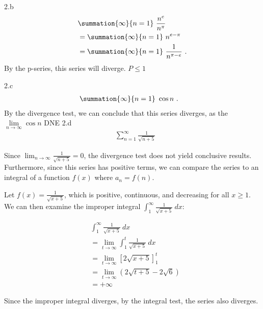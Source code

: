 \documentclass{report}
\begin{document}
    \pagebreak \bigbreak \noindent 
    2.b
    \begin{align*}
        &\summation{\infty}{n=1}\ \frac{n^{e}}{n^{\pi}}\  \\
        &=\summation{\infty}{n=1}\ n^{e-\pi}\  \\
        &=\summation{\infty}{n=1}\ \frac{1}{n^{\pi-e}}\ 
    .\end{align*}
    By the p-series, this series will diverge. $P \leq 1$

    \bigbreak \noindent 
    2.c
    \begin{align*}
        &\summation{\infty}{n=1}\ \cos{n}\ 
    .\end{align*}
    By the divergence test, we can conclude that this series diverges, as the $\lim\limits_{n \to \infty}{\cos{n}} $ DNE
    \bigbreak \noindent 
    2.d
    \begin{align*}
    &\sum_{n=1}^{\infty} \frac{1}{\sqrt{n+5}}
\end{align*}

\noindent
Since \(\lim_{n \to \infty} \frac{1}{\sqrt{n+5}} = 0\), the divergence test does not yield conclusive results. Furthermore, since this series has positive terms, we can compare the series to an integral of a function \(f(x)\) where \(a_n = f(n)\).

\noindent
Let \(f(x) = \frac{1}{\sqrt{x+5}}\), which is positive, continuous, and decreasing for all \(x \geq 1\). We can then examine the improper integral \(\int_{1}^{\infty} \frac{1}{\sqrt{x+5}}\ dx\):

\begin{align*}
    &\int_{1}^{\infty} \frac{1}{\sqrt{x+5}}\ dx \\
    &= \lim_{t \to \infty} \int_{1}^{t} \frac{1}{\sqrt{x+5}}\ dx \\
    &= \lim_{t \to \infty} \left[ 2\sqrt{x+5} \right]_{1}^{t} \\
    &= \lim_{t \to \infty} \left( 2\sqrt{t+5} - 2\sqrt{6} \right) \\
    &= +\infty
\end{align*}

\noindent
Since the improper integral diverges, by the integral test, the series also diverges.
\end{document}
